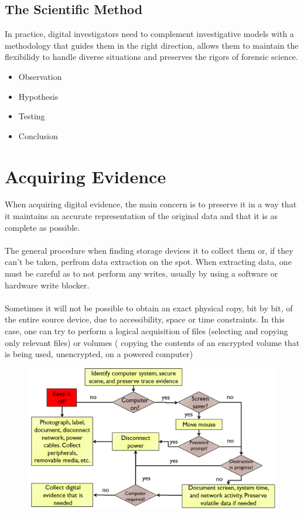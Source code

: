 \documentclass[10pt,a4paper]{report}
\begin{document}
\subsection{The Scientific Method}
In practice, digital investigators need to complement investigative models with a methodology that guides them in the right direction, allows them to maintain the flexibilidy to handle diverse situations and preserves the rigors of forensic science.
\begin{itemize}
\item Observation
\item Hypothesis
\item Testing
\item Conclusion
\end{itemize}
\section{Acquiring Evidence}
When acquiring digital evidence, the main concern is to preserve it in a way that it maintains an accurate representation of the original data and that it is as complete as possible.\\
\\
The general procedure when finding storage devices it to collect them or, if they can't be taken, perfrom data extraction on the spot. When extracting data, one must be careful as to not perform any writes, usually by using a software or hardware write blocker.\\
\\
Sometimes it will not be possible to obtain an exact physical copy, bit by bit, of the entire source device, due to accessibility, space or time constraints. In this case, one can try to perform a logical acquisition of files (selecting and copying only relevant files) or volumes ( copying the contents of an encrypted volume that is being used, unencrypted, on a powered computer)
\begin{figure}[H]
\centering
\includegraphics[scale=0.4]{3.png}
\end{figure}
\end{document}
